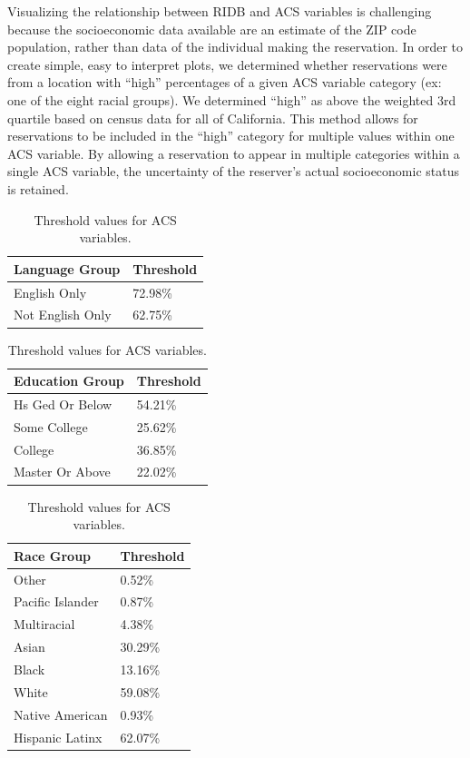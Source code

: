\documentclass[
]{book}
\begin{document}
Visualizing the relationship between RIDB and ACS variables is challenging because the socioeconomic data available are an estimate of the ZIP code population, rather than data of the individual making the reservation. In order to create simple, easy to interpret plots, we determined whether reservations were from a location with ``high'' percentages of a given ACS variable category (ex: one of the eight racial groups). We determined ``high'' as above the weighted 3rd quartile based on census data for all of California. This method allows for reservations to be included in the ``high'' category for multiple values within one ACS variable. By allowing a reservation to appear in multiple categories within a single ACS variable, the uncertainty of the reserver's actual socioeconomic status is retained.

\begin{table}
\caption{\label{tab:unnamed-chunk-28}Threshold values for ACS variables.}

\centering
\begin{tabular}[t]{l|l}
\hline
Language Group & Threshold\\
\hline
English Only & 72.98\%\\
\hline
Not English Only & 62.75\%\\
\hline
\end{tabular}
\centering
\begin{tabular}[t]{l|l}
\hline
Education Group & Threshold\\
\hline
Hs Ged Or Below & 54.21\%\\
\hline
Some College & 25.62\%\\
\hline
College & 36.85\%\\
\hline
Master Or Above & 22.02\%\\
\hline
\end{tabular}
\centering
\begin{tabular}[t]{l|l}
\hline
Race Group & Threshold\\
\hline
Other & 0.52\%\\
\hline
Pacific Islander & 0.87\%\\
\hline
Multiracial & 4.38\%\\
\hline
Asian & 30.29\%\\
\hline
Black & 13.16\%\\
\hline
White & 59.08\%\\
\hline
Native American & 0.93\%\\
\hline
Hispanic Latinx & 62.07\%\\
\hline
\end{tabular}
\end{table}
\end{document}

